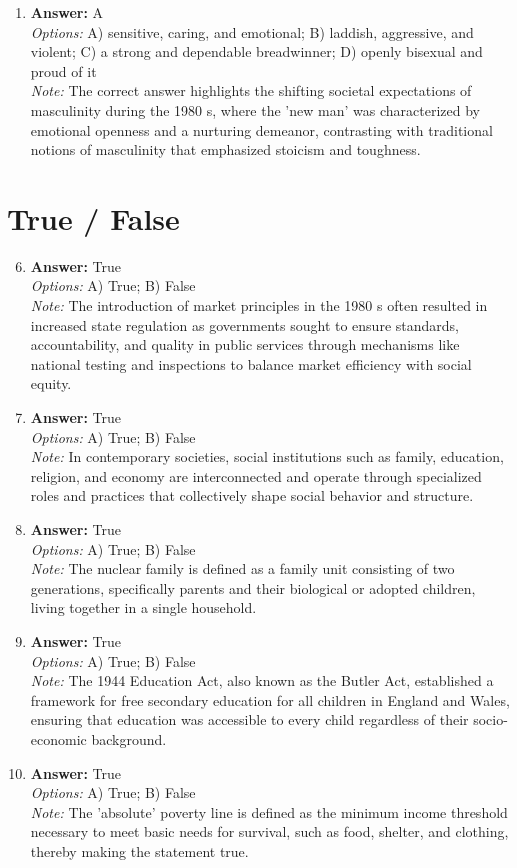 \documentclass[12pt]{article}
\begin{document}
\begin{enumerate}[label=\arabic*.]
\item \textbf{Answer:} A
\\ \textit{Options:} A) sensitive, caring, and emotional; B) laddish, aggressive, and violent; C) a strong and dependable breadwinner; D) openly bisexual and proud of it
\\ \textit{Note:} The correct answer highlights the shifting societal expectations of masculinity during the 1980 s, where the 'new man' was characterized by emotional openness and a nurturing demeanor, contrasting with traditional notions of masculinity that emphasized stoicism and toughness.
\end{enumerate}

\section*{True / False}
\begin{enumerate}[label=\arabic*.]
\setcounter{enumi}{5}
\item \textbf{Answer:} True
\\ \textit{Options:} A) True; B) False
\\ \textit{Note:} The introduction of market principles in the 1980 s often resulted in increased state regulation as governments sought to ensure standards, accountability, and quality in public services through mechanisms like national testing and inspections to balance market efficiency with social equity.
\item \textbf{Answer:} True
\\ \textit{Options:} A) True; B) False
\\ \textit{Note:} In contemporary societies, social institutions such as family, education, religion, and economy are interconnected and operate through specialized roles and practices that collectively shape social behavior and structure.
\item \textbf{Answer:} True
\\ \textit{Options:} A) True; B) False
\\ \textit{Note:} The nuclear family is defined as a family unit consisting of two generations, specifically parents and their biological or adopted children, living together in a single household.
\item \textbf{Answer:} True
\\ \textit{Options:} A) True; B) False
\\ \textit{Note:} The 1944 Education Act, also known as the Butler Act, established a framework for free secondary education for all children in England and Wales, ensuring that education was accessible to every child regardless of their socio-economic background.
\item \textbf{Answer:} True
\\ \textit{Options:} A) True; B) False
\\ \textit{Note:} The 'absolute' poverty line is defined as the minimum income threshold necessary to meet basic needs for survival, such as food, shelter, and clothing, thereby making the statement true.
\end{enumerate}
\end{document}
